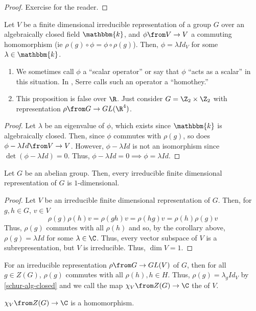 \documentclass[11pt,leqno,oneside]{amsbook}
\newcommand{\bbk}{\mathbbm{k}}
\numberwithin{thm}{section}
\begin{document}
\begin{proof}
  Exercise for the reader.
\end{proof}
\begin{cor}\label{schur-alg-closed}
  Let \(V\) be a finite dimensional irreducible representation of a
  group \(G\) over an algebraically closed field \(\bbk\), and \(\phi
  \from V \to V\) a commuting homomorphism (ie \(\rho(g) \circ \phi = \phi
  \circ \rho(g)\)). Then, \(\phi = \lambda Id_V\) for some \(\lambda
  \in \bbk\).
\end{cor}
\begin{rmk}
  \begin{enumerate}
  \item We sometimes call \(\phi\) a ``scalar operator'' or say that
    \(\phi\) ``acts as a scalar'' in this situation. In \cite{serre},
    Serre calls such an operator a ``homothey.''
  \item This proposition is false over \(\R\). Just consider \(G = \Z_2
    \times \Z_2\) with representation \(\rho \from G \to
    GL(\R^4)\). 
  \end{enumerate}
\end{rmk}
\begin{proof}
  Let \(\lambda\) be an eigenvalue of \(\phi\), which exists since
  \(\bbk\) is algebraically closed. Then, since \(\phi\) commutes with
  \(\rho(g)\), so does \(\phi - \lambda Id \from V \to V\). However, \(\phi -
  \lambda Id\) is not an isomorphism since \(\det(\phi - \lambda Id) =
  0\). Thus, \(\phi - \lambda Id = 0 \implies \phi = \lambda Id\).
\end{proof}
\begin{cor}
  Let \(G\) be an abelian group. Then, every irreducible finite
  dimensional representation of \(G\) is \(1\)-dimensional.
\end{cor}
\begin{proof}
  Let \(V\) be an irreducible finite dimensional representation of
  \(G\). Then, for \(g,h \in G\), \(v \in V\) \[
    \rho(g) \rho(h) v = \rho(gh)v = \rho(hg)v = \rho(h)\rho(g) v
  \]
  Thus, \(\rho(g)\) commutes with all \(\rho(h)\) and so, by the
  corollary above, \(\rho(g) = \lambda Id\) for some \(\lambda \in
  \C\). Thus, every vector subspace of \(V\) is a subrepresentation,
  but \(V\) is irreducible. Thus, \(\dim V = 1\).
\end{proof}
\begin{defn}
  For an irreducible representation \(\rho \from G \to GL(V)\) of
  \(G\), then for all \(g \in Z(G)\), \(\rho(g)\) commutes with all
  \(\rho(h), h \in H\). Thus, \(\rho(g) = \lambda_g Id_V\) by \ref{schur-alg-closed} and
  we call the map \(\chi_V \from Z(G) \to \C\) the  of \(V\).
\end{defn}
\begin{prop}
  \(\chi_V \from Z(G) \to \C\) is a homomorphism.
\end{prop}
\end{document}
